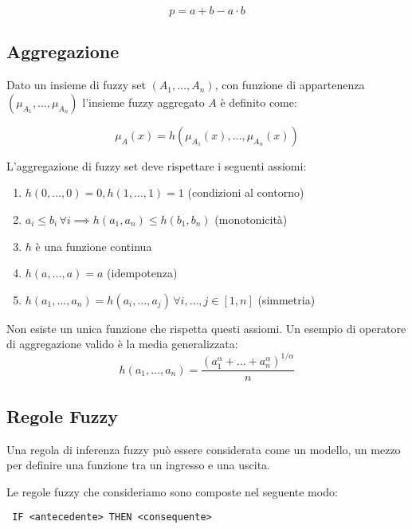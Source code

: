 \begin{equation*}
 p = a+b - a\cdot b 
\end{equation*}

\subsection{Aggregazione}

Dato un insieme di fuzzy set $(A_1, \dots, A_n)$, con funzione di appartenenza $(\mu_{A_1}, \dots, \mu_{A_n})$ l'insieme fuzzy aggregato $A$ è definito come:

\begin{equation*}
   \mu_A(x) = h(\mu_{A_1}(x), \dots, \mu_{A_n}(x))
\end{equation*}

L'aggregazione di fuzzy set deve rispettare i seguenti assiomi:

\begin{enumerate}
 \item $h(0, \dots, 0)=0, h(1, \dots, 1)=1 $ (condizioni al contorno)
 \item $a_i \leq b_i\, \forall i \implies h(a_1, a_n) \leq h(b_1, b_n)$ (monotonicità)
 \item $h$ è una funzione continua
 \item $h(a, \dots,a)=a$ (idempotenza)
 \item $h(a_1,\dots,a_n) = h(a_i, \dots, a_j)\, \forall i,\dots, j\in [1,n]$ (simmetria) %
\end{enumerate}

Non esiste un unica funzione che rispetta questi assiomi. Un esempio di operatore di aggregazione valido è la media generalizzata:
\begin{equation*}
 h(a_1, \dots, a_n) = \dfrac{(a_1^\alpha + \dots + a_n^\alpha)^{1/\alpha}}{n}
\end{equation*}



\subsection{Regole Fuzzy}

Una regola di inferenza fuzzy può essere considerata come un modello, un mezzo per definire una funzione tra un ingresso e una uscita.

Le regole fuzzy che consideriamo sono composte nel seguente modo:
\begin{verbatim}
 IF <antecedente> THEN <consequente>
\end{verbatim}

